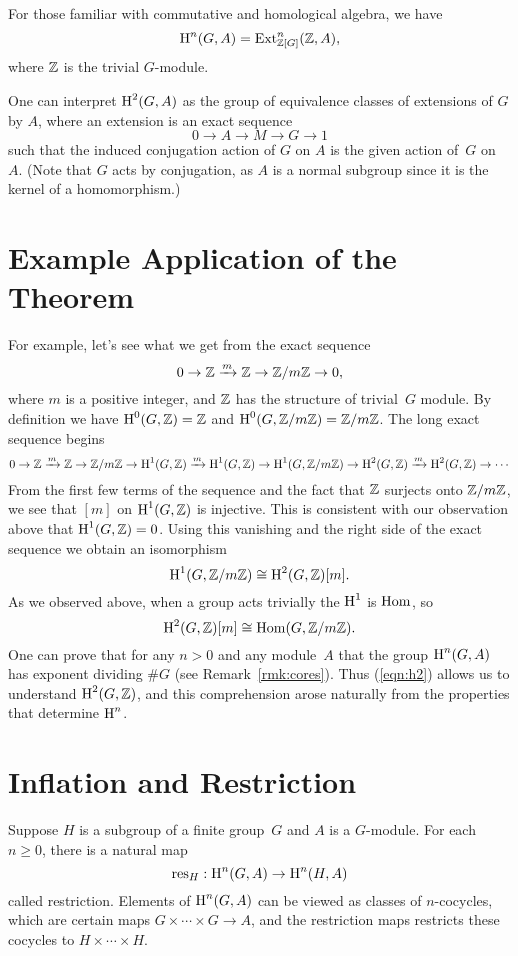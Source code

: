 \begin{remark}
  For those familiar with commutative and homological algebra, we have
$$
  \operatorname{H}^n(G,A) = \operatorname{Ext}^n_{\mathbb{Z}[G]}(\mathbb{Z}, A),
$$
where $\mathbb{Z}$ is the trivial $G$-module.
\end{remark}

\begin{remark}
  One can interpret $\operatorname{H}^2(G,A)$ as the group of equivalence classes of
  extensions of $G$ by $A$, where an extension is an exact sequence
  $$0\to A \to M \to G \to 1$$ such that the induced conjugation action
  of $G$ on $A$ is the given action of~$G$ on~$A$.
(Note that $G$ acts by conjugation, as $A$ is a normal
subgroup since it is the kernel of a homomorphism.)
\end{remark}


\section{Example Application of the Theorem}
For example, let's see what we get from the exact sequence
$$
 0 \to \mathbb{Z} \xrightarrow{m} \mathbb{Z} \to \mathbb{Z}/m\mathbb{Z} \to 0,
$$
where $m$ is a positive integer, and $\mathbb{Z}$ has the structure of
trivial~$G$ module.  By definition we have
$\operatorname{H}^0(G,\mathbb{Z}) = \mathbb{Z}$ and $\operatorname{H}^0(G,\mathbb{Z}/m\mathbb{Z})=\mathbb{Z}/m\mathbb{Z}$.
The long exact sequence begins
$$
  0 \to \mathbb{Z} \xrightarrow{m} \mathbb{Z} \to \mathbb{Z}/m\mathbb{Z} \to \operatorname{H}^1(G,\mathbb{Z}) \xrightarrow{m}
\operatorname{H}^1(G,\mathbb{Z}) \to \operatorname{H}^1(G,\mathbb{Z}/m\mathbb{Z})\to
\operatorname{H}^2(G,\mathbb{Z}) \xrightarrow{m} \operatorname{H}^2(G,\mathbb{Z}) \to \cdots
$$
From the first few terms of the sequence and the fact
that $\mathbb{Z}$ surjects onto $\mathbb{Z}/m\mathbb{Z}$, we see that $[m]$
on $\operatorname{H}^1(G,\mathbb{Z})$ is injective.
This is consistent with our observation above that
$\operatorname{H}^1(G,\mathbb{Z}) = 0$. Using this vanishing and the right side of the
exact sequence we obtain an isomorphism
$$
\operatorname{H}^1(G,\mathbb{Z}/m\mathbb{Z}) \cong \operatorname{H}^2(G,\mathbb{Z})[m].
$$
As we observed above, when a group acts trivially the $\operatorname{H}^1$
is $\operatorname{Hom}$, so
\begin{equation}\label{eqn:h2}
  \operatorname{H}^2(G,\mathbb{Z})[m] \cong \operatorname{Hom}(G,\mathbb{Z}/m\mathbb{Z}).
\end{equation}
One can prove that for any $n>0$ and any module~$A$ that the group
$\operatorname{H}^n(G,A)$ has exponent dividing $\#G$ (see Remark~\ref{rmk:cores}).
Thus (\ref{eqn:h2}) allows
us to understand $\operatorname{H}^2(G,\mathbb{Z})$, and this comprehension arose
naturally from the properties that determine $\operatorname{H}^n$.



\section{Inflation and Restriction}
Suppose $H$ is a subgroup of a finite group~$G$ and $A$
is a $G$-module.  For each~$n\geq 0$, there is a natural map
$$
  \operatorname{res}_H : \operatorname{H}^n(G,A) \to \operatorname{H}^n(H,A)
$$
called restriction.  Elements of $\operatorname{H}^n(G,A)$ can be viewed as classes
of $n$-cocycles, which are certain maps $G \times \cdots \times G \to
A$, and the restriction maps  restricts these cocycles to $H
\times \cdots \times H$.

